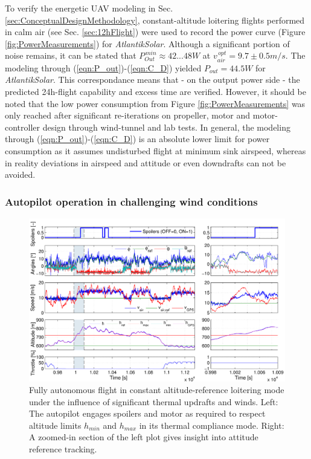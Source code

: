 To verify the energetic UAV modeling in Sec. \ref{sec:ConceptualDesignMethodology}, constant-altitude loitering flights performed in calm air (see Sec. \ref{sec:12hFlight}) were used to record the power curve (Figure \ref{fig:PowerMeasurements}) for \textit{AtlantikSolar}. Although a significant portion of noise remains, it can be stated that $P_{Out}^{\,min}\approx42...48W$ at $v_{air}^{\,opt}=9.7\pm0.5m/s$. The modeling through (\ref{eqn:P_out})-(\ref{eqn:C_D}) yielded $P_{out}=44.5W$ for \textit{AtlantikSolar}. This correspondance means that - on the output power side - the predicted 24h-flight capability and excess time are verified. However, it should be noted that the low power consumption from Figure \ref{fig:PowerMeasurements} was only reached after significant re-iterations on propeller, motor and motor-controller design through wind-tunnel and lab tests. In general, the modeling through (\ref{eqn:P_out})-(\ref{eqn:C_D}) is an absolute lower limit for power consumption as it assumes undisturbed flight at minimum sink airspeed, whereas in reality deviations in airspeed and attitude or even downdrafts can not be avoided.

\subsubsection{Autopilot operation in challenging wind conditions}

\begin{figure}[tb]
    \centering
     \includegraphics[width=\linewidth]{images/ControlTestFlight/ControlTestFlight.pdf}
    \caption{Fully autonomous flight in constant altitude-reference loitering mode under the influence of significant thermal updrafts and winds. Left: The autopilot engages spoilers and motor as required to respect altitude limits $h_{min}$ and $h_{max}$ in its thermal compliance mode. Right: A zoomed-in section of the left plot gives insight into attitude reference tracking.} 
    \label{fig:ControlTestFlight}
\end{figure}

